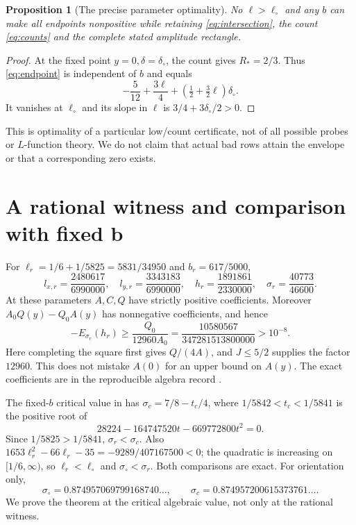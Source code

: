 \documentclass[11pt,a4paper]{article}
\newtheorem{proposition}[theorem]{Proposition}
\theoremstyle{definition}
\newcommand{\sig}{\sigma_\circ}
\begin{document}
\begin{proposition}[The precise parameter optimality]\label{prop:optimal}
No $\ell>\ell_\circ$ and any $b$ can make all endpoints
nonpositive while retaining \eqref{eq:intersection}, the count
\eqref{eq:counts} and the complete stated amplitude rectangle.
\end{proposition}
\begin{proof}
At the fixed point $y=0,\delta=\delta_\circ$, the count gives
$R_*=2/3$. Thus \eqref{eq:endpoint} is independent of $b$ and equals
\[
 -\frac5{12}+\frac{3\ell}{4}
          +(\tfrac12+\tfrac32\ell)\delta_\circ .
\]
It vanishes at $\ell_\circ$ and its slope in $\ell$ is
$3/4+3\delta_\circ/2>0$.
\end{proof}
This is optimality of a particular low/count certificate, not of
all possible probes or $L$-function theory. We do not claim that
actual bad rows attain the envelope or that a corresponding
zero exists.

\section{A rational witness and comparison with fixed b}
\label{sec:rational}
For $\ell_r=1/6+1/5825=5831/34950$ and $b_r=617/5000$,
\[
 l_{x,r}=\frac{2480617}{6990000},\quad
 l_{y,r}=\frac{3343183}{6990000},\quad
 h_r=\frac{1891861}{2330000},\quad \sigma_r=\frac{40773}{46600}.
\]
At these parameters $A,C,Q$ have strictly positive coefficients.
Moreover $A_0Q(y)-Q_0A(y)$ has nonnegative coefficients, and hence
\[
 -E_{\sigma_r}(h_r)\ge\frac{Q_0}{12960A_0}
 =\frac{10580567}{347281513800000}>10^{-8}.
\]
Here completing the square first gives $Q/(4A)$, and
$J\le5/2$ supplies the factor $12960$. This does not mistake
$A(0)$ for an upper bound on $A(y)$.
The exact coefficients are in the reproducible algebra record
\cite{FreeBAudit}.

The fixed-$b$ critical value in \cite{Note447} has
$\sigma_c=7/8-t_c/4$, where
$1/5842<t_c<1/5841$ is the positive root of
\[
 28224-164747520t-669772800t^2=0.
\]
Since $1/5825>1/5841$, $\sigma_r<\sigma_c$.
Also
$1653\ell_r^2-66\ell_r-35=-9289/407167500<0$;
the quadratic is increasing on $[1/6,\infty)$, so
$\ell_r<\ell_\circ$ and $\sig<\sigma_r$.
Both comparisons are exact. For orientation only,
\[
 \sig=0.874957069799168740\ldots,\qquad
 \sigma_c=0.874957200615373761\ldots .
\]
We prove the theorem at the critical algebraic value, not only
at the rational witness.
\end{document}

